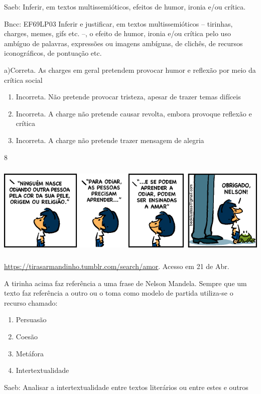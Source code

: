 {{\begin{itemize}
\begin{itemize}
Saeb: Inferir, em textos multissemióticos, efeitos de humor, ironia e/ou
crítica.

Bncc: EF69LP03 Inferir e justificar, em textos multissemióticos --
tirinhas, charges, memes, gifs etc. --, o efeito de humor, ironia e/ou
crítica pelo uso ambíguo de palavras, expressões ou imagens ambíguas, de
clichês, de recursos iconográficos, de pontuação etc.

a)Correta. As charges em geral pretendem provocar humor e reflexão por
meio da crítica social

\begin{enumerate}
\def\labelenumi{\arabic{enumi}.}
\item
  Incorreta. Não pretende provocar tristeza, apesar de trazer temas
  difíceis
\item
  Incorreta. A charge não pretende causar revolta, embora provoque
  reflexão e crítica
\item
  Incorreta. A charge não pretende trazer mensagem de alegria
\end{enumerate}

\num{8}

\includegraphics[width=5.90551in,height=1.72222in]{./imgSAEB_7_POR/media/image18.png}

\href{https://tirasarmandinho.tumblr.com/search/amor}{\uline{https://tirasarmandinho.tumblr.com/search/amor}}.
Acesso em 21 de Abr.

A tirinha acima faz referência a uma frase de Nelson Mandela. Sempre que
um texto faz referência a outro ou o toma como modelo de partida
utiliza-se o recurso chamado:

\begin{enumerate}
\def\labelenumi{\alph{enumi})}
\item
  Persuasão
\item
  Coesão
\item
  Metáfora
\item
  Intertextualidade
\end{enumerate}

Saeb: Analisar a intertextualidade entre textos literários ou entre
estes e outros


\end{itemize}
\end{itemize}}}
